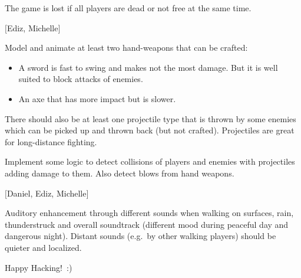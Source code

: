 \documentclass[A4paper]{gdv/gdv}
\begin{document}
\begin{gdvSheet}
The game is lost if all players are dead or not free at the same time.

$[$Ediz, Michelle$]$

Model and animate at least two hand-weapons that can be crafted:

\begin{itemize}
	\item A sword is fast to swing and makes not the most damage.
		  But it is well suited to block attacks of enemies.
	\item An axe that has more impact but is slower.
\end{itemize}

There should also be at least one projectile type that is thrown by some enemies which can be picked up and thrown back (but not crafted).
Projectiles are great for long-distance fighting.

Implement some logic to detect collisions of players and enemies with projectiles adding damage to them.
Also detect blows from hand weapons.

$[$Daniel, Ediz, Michelle$]$

Auditory enhancement through different sounds when walking on surfaces, rain, thunderstruck and overall soundtrack (different mood during peaceful day and dangerous night).
Distant sounds (e.g.\ by other walking players) should be quieter and localized.

\vspace*{30px}

% 
% 

\vfill\hfill Happy Hacking!~:) \hfill\ %

\end{gdvSheet}
\end{document}
